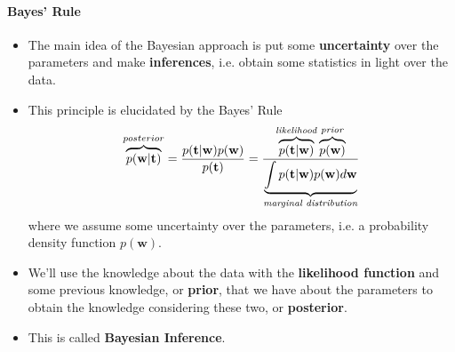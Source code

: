 \begin{frame}{\insertsection}
	\framesubtitle{Bayes' Rule}

	\begin{itemize}
		\item The main idea of the Bayesian approach is put some \textcolor{UniOrange}{\textbf{uncertainty}} over the parameters and make \textcolor{UniOrange}{\textbf{inferences}}, i.e. obtain some statistics in light over the data.
		\item This principle is elucidated by the Bayes' Rule
		\begin{equation*}
			\overbrace{p(\mathbf{w}|\mathbf{t})}^{posterior} = \frac{p(\mathbf{t}|\mathbf{w}) p(\mathbf{w})}{p(\mathbf{t})} = \frac{\overbrace{p(\mathbf{t}|\mathbf{w})}^{\text{\textit{likelihood}}} \overbrace{p(\mathbf{w})}^{\text{\textit{prior}}}}{\underbrace{\int p(\mathbf{t}|\mathbf{w}) p(\mathbf{w}) d\mathbf{w}}_{\text{\textit{marginal distribution}}}}
		 \end{equation*}
		 where we assume some uncertainty over the parameters, i.e. a probability density function $p(\mathbf{w})$.
		 \item We'll use the knowledge about the data with the \textcolor{UniOrange}{\textbf{likelihood function}} and some previous knowledge, or \textcolor{UniOrange}{\textbf{prior}}, that we have about the parameters to obtain the knowledge considering these two, or \textcolor{UniOrange}{\textbf{posterior}}.
		 \item This is called \textcolor{UniOrange}{\textbf{Bayesian Inference}}.
	\end{itemize}
\end{frame}

